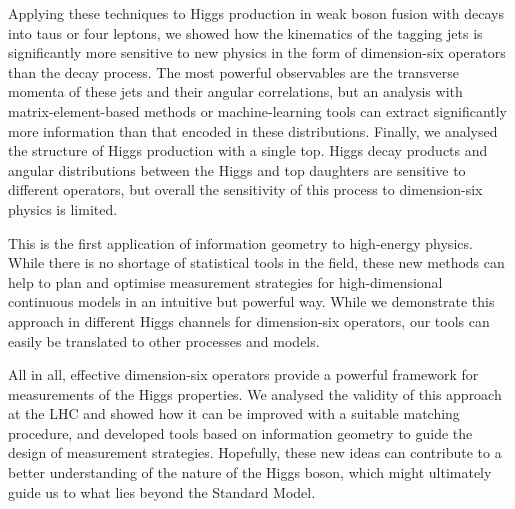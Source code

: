Applying these techniques to Higgs production in weak boson fusion
with decays into taus or four leptons, we showed how the kinematics of
the tagging jets is significantly more sensitive to new physics in the
form of dimension-six operators than the decay process. The most
powerful observables are the transverse momenta of these jets and
their angular correlations, but an analysis with matrix-element-based
methods or machine-learning tools can extract significantly more
information than that encoded in these distributions. Finally, we
analysed the structure of Higgs production with a single top. Higgs
decay products and angular distributions between the Higgs and top
daughters are sensitive to different operators, but overall the
sensitivity of this process to dimension-six physics is limited.

This is the first application of information geometry to high-energy
physics. While there is no shortage of statistical tools in the field,
these new methods can help to plan and optimise measurement strategies
for high-dimensional continuous models in an intuitive but powerful
way. While we demonstrate this approach in different Higgs channels
for dimension-six operators, our tools can easily be translated to other
processes and models.

\newparagraph
%
All in all, effective dimension-six operators provide a powerful
framework for measurements of the Higgs properties. We analysed the
validity of this approach at the LHC and showed how it can be improved
with a suitable matching procedure, and developed tools based on
information geometry to guide the design of measurement
strategies. Hopefully, these new ideas can contribute to a better
understanding of the nature of the Higgs boson, which might ultimately
guide us to what lies beyond the Standard Model.
